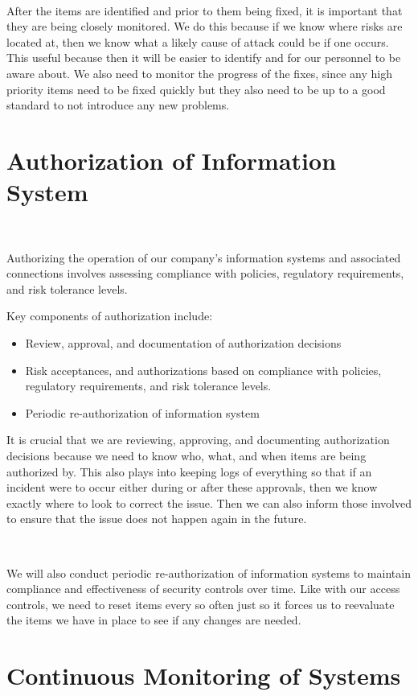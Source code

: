 \documentclass[12pt,a4paper]{report}
\begin{document}
\

After the items are identified and prior to them being fixed, it is important that they are being closely monitored.
We do this because if we know where risks are located at, then we know what a likely cause of attack could be if one occurs.
This useful because then it will be easier to identify and for our personnel to be aware about.
We also need to monitor the progress of the fixes, since any high priority items need to be fixed quickly but they also need to be up to a good standard to not introduce any new problems.

\section{Authorization of Information System}
\

Authorizing the operation of our company's information systems and associated connections involves assessing compliance with policies, regulatory requirements, and risk tolerance levels. 
\pagebreak %

\noindent
Key components of authorization include:
\begin{itemize}
 \item Review, approval, and documentation of authorization decisions
 \item Risk acceptances, and authorizations based on compliance with policies, regulatory requirements, and risk tolerance levels.
 \item Periodic re-authorization of information system
\end{itemize}

It is crucial that we are reviewing, approving, and documenting authorization decisions because we need to know who, what, and when items are being authorized by.
This also plays into keeping logs of everything so that if an incident were to occur either during or after these approvals, then we know exactly where to look to correct the issue.
Then we can also inform those involved to ensure that the issue does not happen again in the future.

\

We will also conduct periodic re-authorization of information systems to maintain compliance and effectiveness of security controls over time.
Like with our access controls, we need to reset items every so often just so it forces us to reevaluate the items we have in place to see if any changes are needed.

\section{Continuous Monitoring of Systems}
\
\end{document}
